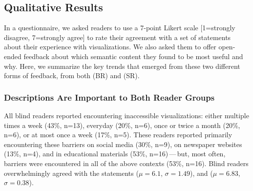 \subsection{Qualitative Results}
\label{section:qualResults}

In a questionnaire, we asked readers to use a 7-point Likert scale [1=strongly disagree, 7=strongly agree] to rate their agreement with a set of statements about their experience with visualizations.
We also asked them to offer open-ended feedback about which semantic content they found to be most useful and why.
Here, we summarize the key trends that emerged from these two different forms of feedback, from both  (BR) and  (SR).

\subsubsection{Descriptions Are Important to Both Reader Groups}
\label{section:qualResultsA}
All blind readers reported encountering inaccessible visualizations: either multiple times a week ({43}\%, n=13), everyday ({20}\%, n=6), once or twice a month ({20}\%, n=6), or at most once a week ({17}\%, n=5).
These readers reported primarily encountering these barriers on social media ({30}\%, n=9), on newspaper websites ({13}\%, n=4), and in educational materials ({53}\%, n=16)\,---\,but, most often, barriers were encountered in all of the above contexts ({53}\%, n=16).
Blind readers overwhelmingly agreed with the statements 
 ($\mu=6.1$, $\sigma=1.49$), and  ($\mu=6.83$, $\sigma=0.38$). 

